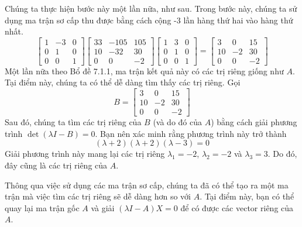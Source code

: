 Chúng ta thực hiện bước này một lần nữa, như sau. Trong bước này, chúng ta sử dụng ma trận sơ cấp thu được bằng cách cộng -3 lần hàng thứ hai vào hàng thứ nhất.
\begin{equation}
\begin{bmatrix}1&-3&0\\ 0&1&0\\ 0&0&1\end{bmatrix}\begin{bmatrix}33&-105&105\\ 10&-32&30\\ 0&0&-2\end{bmatrix}\begin{bmatrix}1&3&0\\ 0&1&0\\ 0&0&1\end{bmatrix}=\begin{bmatrix}3&0&15\\ 10&-2&30\\ 0&0&-2\end{bmatrix}
\end{equation}
Một lần nữa theo Bổ đề 7.1.1, ma trận kết quả này có các trị riêng giống như $A$. Tại điểm này, chúng ta có thể dễ dàng tìm thấy các trị riêng. Gọi
\begin{equation*}
B=\begin{bmatrix}3&0&15\\ 10&-2&30\\ 0&0&-2\end{bmatrix}
\end{equation*}
Sau đó, chúng ta tìm các trị riêng của $B$ (và do đó của $A$) bằng cách giải phương trình $\det(\lambda I-B)=0$. Bạn nên xác minh rằng phương trình này trở thành
\begin{equation*}
(\lambda+2)(\lambda+2)(\lambda-3)=0
\end{equation*}
Giải phương trình này mang lại các trị riêng $\lambda_{1}=-2$, $\lambda_{2}=-2$ và $\lambda_{3}=3$. Do đó, đây cũng là các trị riêng của $A$.

Thông qua việc sử dụng các ma trận sơ cấp, chúng ta đã có thể tạo ra một ma trận mà việc tìm các trị riêng sẽ dễ dàng hơn so với $A$. Tại điểm này, bạn có thể quay lại ma trận gốc $A$ và giải $(\lambda I-A)X=0$ để có được các vector riêng của $A$.

